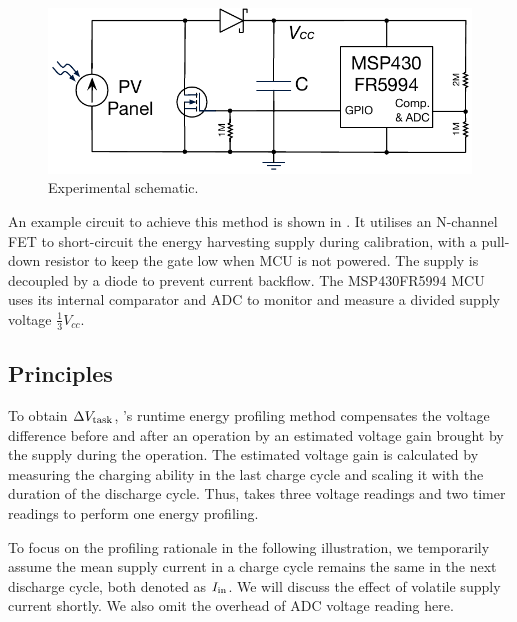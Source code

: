\begin{figure}
  \centering
  \includegraphics[width=0.8\columnwidth]{ch5_optic/figures/naive_circuit.pdf}
  \caption{Experimental schematic.}
  \label{fig:naive_circuit}
\end{figure}

An example circuit to achieve this method is shown in . 
It utilises an N-channel FET to short-circuit the energy harvesting supply during calibration, with a pull-down resistor to keep the gate low when MCU is not powered. 
The supply is decoupled by a diode to prevent current backflow. 
The MSP430FR5994 MCU uses its internal comparator and ADC to monitor and measure a divided supply voltage $\frac{1}{3}V_{cc}$. 

\subsection{Principles}

To obtain $\Delta V_{\text{task}}$, \nn{}'s runtime energy profiling method compensates the voltage difference before and after an operation by an estimated voltage gain brought by the supply during the operation.
The estimated voltage gain is calculated by measuring the charging ability in the last charge cycle and scaling it with the duration of the discharge cycle. 
Thus, \nn{} takes three voltage readings and two timer readings to perform one energy profiling. 

To focus on the profiling rationale in the following illustration, we temporarily assume the mean supply current in a charge cycle remains the same in the next discharge cycle, both denoted as $I_{\text{in}}$. 
We will discuss the effect of volatile supply current shortly. 
We also omit the overhead of ADC voltage reading here. 

